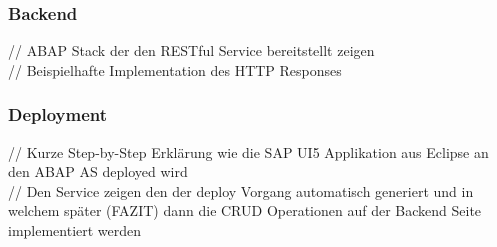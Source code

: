 \subsubsection{Backend}
// ABAP Stack der den RESTful Service bereitstellt zeigen\\
// Beispielhafte Implementation des HTTP Responses\\

\subsubsection{Deployment}
// Kurze Step-by-Step Erklärung wie die SAP UI5 Applikation aus Eclipse an den ABAP AS deployed wird\\
// Den Service zeigen den der deploy Vorgang automatisch generiert und in welchem später (FAZIT) dann die CRUD Operationen auf der Backend Seite implementiert werden\\
